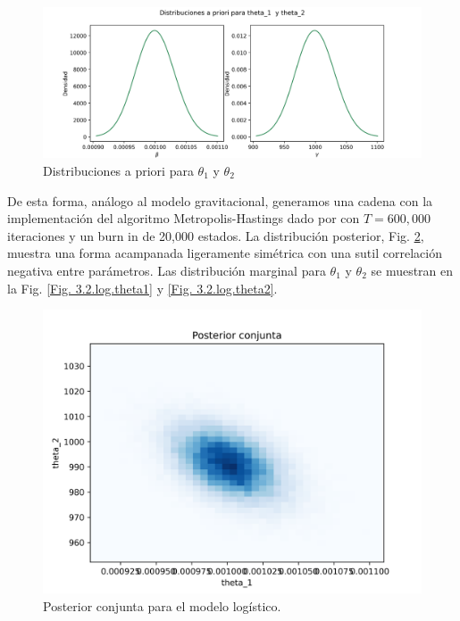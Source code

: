 \begin{figure} 
    \centering 
    \includegraphics[width = 15 cm]{img/Exp_Central_logistico_sigma/Figuras/Generales/Apriori_logistico_sigma.png}     
    \caption{Distribuciones a priori para $\theta_1$ y $\theta_2$}
    \label{Fig. 3.2.log.priori}
\end{figure} 

De esta forma, análogo al modelo gravitacional, generamos una cadena con la implementación del algoritmo Metropolis-Hastings dado por \cite{christen2010general} con $T = 600,000$ iteraciones y un burn in de 20,000 estados. La distribución posterior, Fig. \ref{Fig. 3.2.log.conjunta}, muestra una forma acampanada ligeramente simétrica con una sutil correlación negativa entre parámetros. Las distribución marginal para $\theta_1$ y $\theta_2$ se muestran en la Fig. \ref{Fig. 3.2.log.theta1} y \ref{Fig. 3.2.log.theta2}.

\begin{figure}
    \centering 
    \includegraphics[width = 10 cm ]{img/Exp_Central_logistico_sigma/Figuras/Generales/Conjunta_logistico_sigma.png} 
    \caption{Posterior conjunta para el modelo logístico.}
    \label{Fig. 3.2.log.conjunta}
\end{figure} 

